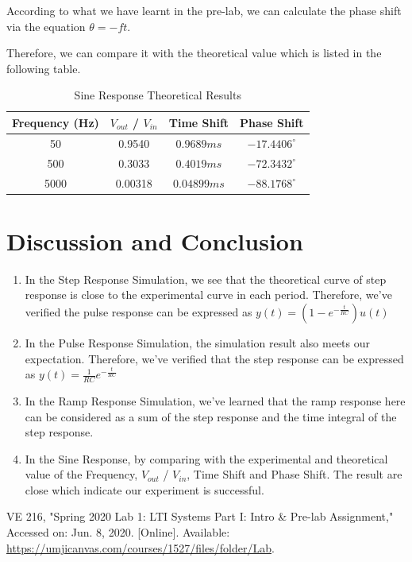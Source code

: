 \documentclass [utf8] {article}
\begin{document}
{{        According to what we have learnt in the pre-lab, we can calculate the phase shift via the equation $\theta = -ft$. 


        Therefore, we can compare it with the theoretical value which is listed in the following table.

        \begin{table}[h]
            \centering
            \begin{tabular}{|c|c|c|c|}
                \hline
                Frequency (Hz) & $V_{out}$ / $V_{in}$ & Time Shift & Phase Shift \\
                \hline
                50      &    0.9540   &    $0.9689ms$        & $-17.4406^{\circ}$\\
                500     &    0.3033  &    $0.4019ms$        & $-72.3432^{\circ}$\\
                5000    &    0.00318    &   $0.04899ms$         &    $-88.1768^{\circ}$\\
                \hline            
            \end{tabular}
            \caption{Sine Response Theoretical Results}
            \label{table:tb1}
        \end{table}  
    }
}

\section{Discussion and Conclusion}
{
    \begin{enumerate}
        \item In the Step Response Simulation, we see that the theoretical curve of step response is close to the experimental curve in each period. Therefore, we've verified the pulse response can be expressed as $y(t) = (1-e^{-\frac{t}{RC}})u(t)$
        \item In the Pulse Response Simulation, the simulation result also meets our expectation. Therefore, we've verified that the step response can be expressed as $y(t) = \frac{1}{RC}e^{-\frac{t}{RC}}$
        \item In the Ramp Response Simulation, we've learned that the ramp response here can be considered as a sum of the step response and the time integral of the step response.
        \item In the Sine Response, by comparing with the experimental and theoretical value of the Frequency, $V_{out}$ / $V_{in}$, Time Shift and Phase Shift. The result are close which indicate our experiment is successful.
    \end{enumerate}
}
\newpage
\begin{thebibliography}{99}
     VE 216, "Spring 2020 Lab 1: LTI Systems Part I: Intro \& Pre-lab Assignment," Accessed on: Jun. 8, 2020. [Online]. Available: \url{https://umjicanvas.com/courses/1527/files/folder/Lab}.
\end{thebibliography}
\end{document}
